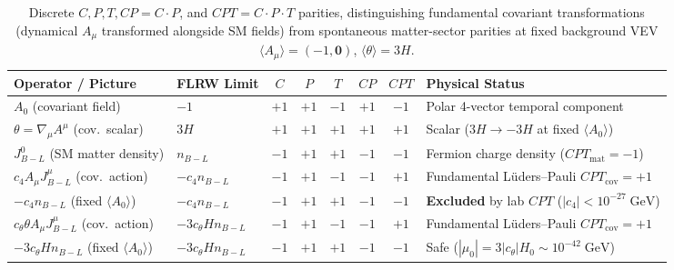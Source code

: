 \documentclass[11pt,a4paper]{article}
\begin{document}
\begin{table}[htbp]
\centering
\caption{Discrete $C, P, T, CP = C\cdot P$, and $CPT = C\cdot P\cdot T$ parities, distinguishing fundamental covariant transformations (dynamical $A_\mu$ transformed alongside SM fields) from spontaneous matter-sector parities at fixed background VEV $\langle A_\mu\rangle = (-1,\mathbf{0})$, $\langle\theta\rangle = 3H$.}
\label{tab:cpt-table}
\vspace{0.35em}
\footnotesize
\setlength{\tabcolsep}{3.6pt}
\begin{tabular}{llcccccl}
\toprule
Operator / Picture & FLRW Limit & $C$ & $P$ & $T$ & $CP$ & $CPT$ & Physical Status \\
\midrule
$A_0$ (covariant field) & $-1$ & $+1$ & $+1$ & $-1$ & $+1$ & $-1$ & Polar 4-vector temporal component \\
$\theta = \nabla_\mu A^\mu$ (cov.\ scalar) & $3H$ & $+1$ & $+1$ & $+1$ & $+1$ & $+1$ & Scalar ($3H \to -3H$ at fixed $\langle A_0\rangle$) \\
$J_{B-L}^0$ (SM matter density) & $n_{B-L}$ & $-1$ & $+1$ & $+1$ & $-1$ & $-1$ & Fermion charge density ($CPT_{\mathrm{mat}} = -1$) \\
$c_4 A_\mu J_{B-L}^\mu$ (cov.\ action) & $-c_4 n_{B-L}$ & $-1$ & $+1$ & $-1$ & $-1$ & $+1$ & Fundamental L\"uders--Pauli $CPT_{\mathrm{cov}} = +1$ \\
$-c_4 n_{B-L}$ (fixed $\langle A_0\rangle$) & $-c_4 n_{B-L}$ & $-1$ & $+1$ & $+1$ & $-1$ & $-1$ & \textbf{Excluded} by lab $CPT$ ($|c_4| < 10^{-27}\;\mathrm{GeV}$) \\
$c_\theta \theta A_\mu J_{B-L}^\mu$ (cov.\ action) & $-3c_\theta H n_{B-L}$ & $-1$ & $+1$ & $-1$ & $-1$ & $+1$ & Fundamental L\"uders--Pauli $CPT_{\mathrm{cov}} = +1$ \\
$-3c_\theta H n_{B-L}$ (fixed $\langle A_0\rangle$) & $-3c_\theta H n_{B-L}$ & $-1$ & $+1$ & $+1$ & $-1$ & $-1$ & Safe ($|\mu_0| = 3|c_\theta|H_0 \sim 10^{-42}\;\mathrm{GeV}$) \\
\bottomrule
\end{tabular}
\end{table}
\end{document}
